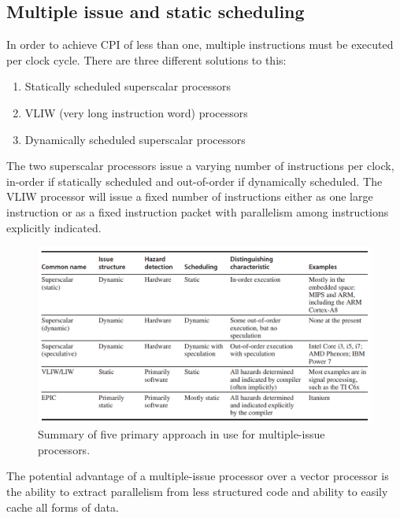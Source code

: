 \documentclass[11pt]{article}
\begin{document}
\subsection{Multiple issue and static scheduling}
In order to achieve CPI of less than one, multiple instructions must be executed per clock cycle. There are three different solutions to this:
\begin{enumerate}
\item Statically scheduled superscalar processors
\item VLIW (very long instruction word) processors
\item Dynamically scheduled superscalar processors
\end{enumerate}
The two superscalar processors issue a varying number of instructions per clock, in-order if statically scheduled and out-of-order if dynamically scheduled. The VLIW processor will issue a fixed number of instructions either as one large instruction or as a fixed instruction packet with parallelism among instructions explicitly indicated. 
\begin{figure}[H]
\centering
\includegraphics[width=1\textwidth, keepaspectratio]{imgs/multiple-issue.png}
\caption{Summary of five primary approach in use for multiple-issue processors.}
\end{figure}
\noindent
The potential advantage of a multiple-issue processor over a vector processor is the ability to extract parallelism from less structured code and ability to easily cache all forms of data.
\end{document}
